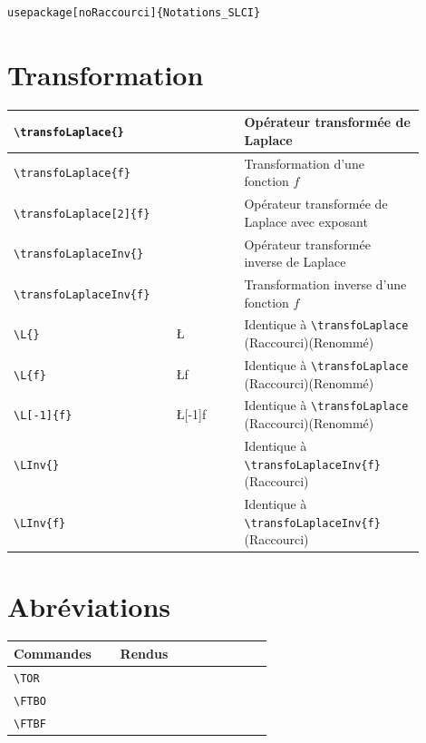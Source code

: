 \documentclass[a4paper,12pt]{article}
\newcommand{\rac}{({\color{red}Raccourci})}
\newcommand{\ren}{({\color{blue}Renommé})}
\begin{document}
	\begin{verbatim}
usepackage[noRaccourci]{Notations_SLCI}
	\end{verbatim}


	\section{Transformation}

	\begin{tabular}{|p{0.35\linewidth}|p{0.15\linewidth}|p{0.4\linewidth}|}
		\hline
			\verb!\transfoLaplace{}!	&	\transfoLaplace{} &	Opérateur transformée de Laplace
		\\\hline
			\verb!\transfoLaplace{f}!	&	\transfoLaplace{f} &	Transformation d'une fonction $f$
		\\\hline
			\verb!\transfoLaplace[2]{f}!	&	\transfoLaplace[2]{f} &	Opérateur transformée de Laplace avec exposant
		\\\hline
			\verb!\transfoLaplaceInv{}!	&	\transfoLaplaceInv{} &		Opérateur transformée inverse de Laplace
		\\\hline
			\verb!\transfoLaplaceInv{f}!	&	\transfoLaplaceInv{f} &		Transformation inverse d'une fonction $f$
		\\\hline
			\verb!\L{}!		&	\L{} 	&	Identique à \verb'\transfoLaplace' \rac\ren
		\\\hline
			\verb!\L{f}!	&	\L{f} 		&	Identique à \verb'\transfoLaplace' \rac\ren
		\\\hline
			\verb!\L[-1]{f}!	&	\L[-1]{f} &	Identique à \verb'\transfoLaplace' \rac\ren
		\\\hline
			\verb!\LInv{}!	&	\LInv{} &	Identique à \verb!\transfoLaplaceInv{f}! \rac
		\\\hline
			\verb!\LInv{f}!	&	\LInv{f} &	Identique à \verb!\transfoLaplaceInv{f}! \rac
		\\\hline
	\end{tabular}




	\section{Abréviations}
	\begin{tabular}{|p{0.35\linewidth}|p{0.5\linewidth}|}
		\hline
			\textbf{Commandes}&\textbf{Rendus}
		\\\hline\hline
			\verb!\TOR!	&	\TOR	
		\\\hline
			\verb!\FTBO!	&	\FTBO	
		\\\hline
			\verb!\FTBF!	&	\FTBF	
		\\\hline
	\end{tabular}
\end{document}
